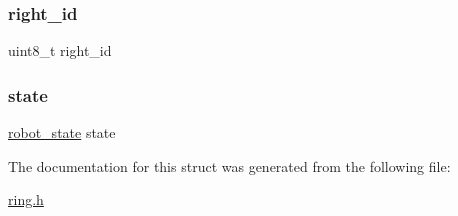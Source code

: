 \subsubsection{\texorpdfstring{right\+\_\+id}{right\_id}}
{\footnotesize\ttfamily uint8\+\_\+t right\+\_\+id}

\mbox{\label{structnearest__neighbor__t_aadbb2fcd5b6edab38e3aa5aca6d92439}} 
\subsubsection{\texorpdfstring{state}{state}}
{\footnotesize\ttfamily \hyperlink{ring_8h_a69b20b1a04c8e4cf3b72851b966259ec}{robot\+\_\+state} state}



The documentation for this struct was generated from the following file\+:\begin{DoxyCompactItemize}
\item 
\hyperlink{ring_8h}{ring.\+h}\end{DoxyCompactItemize}
